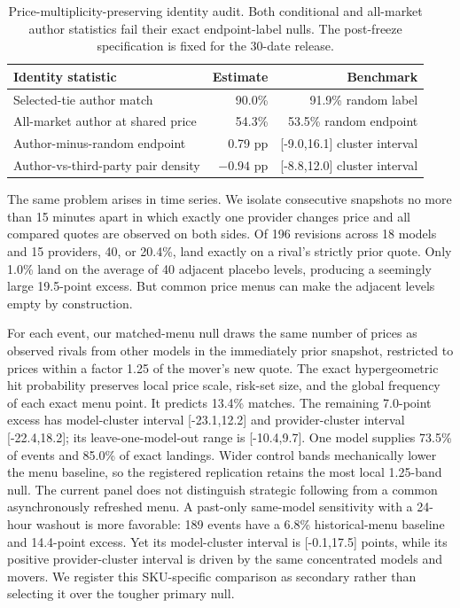 \documentclass[11pt]{article}
\newcommand{\1}{\mathbf{1}}
\begin{document}
{\begin{table}[H]
\centering
\small
\begin{tabular}{lrr}
\toprule
Identity statistic & Estimate & Benchmark \\
\midrule
Selected-tie author match & 90.0\% & 91.9\% random label \\
All-market author at shared price & 54.3\% & 53.5\% random endpoint \\
Author-minus-random endpoint & 0.79 pp & [-9.0,16.1] cluster interval \\
Author-vs-third-party pair density & $-0.94$ pp & [-8.8,12.0] cluster interval \\
\bottomrule
\end{tabular}
\caption{Price-multiplicity-preserving identity audit.  Both conditional and
all-market author statistics fail their exact endpoint-label nulls.  The
post-freeze specification is fixed for the 30-date release.}
\label{tab:authoratom}
\end{table}

The same problem arises in time series.  We isolate consecutive snapshots no more
than 15 minutes apart in which exactly one provider changes price and all compared
quotes are observed on both sides.  Of 196 revisions across 18 models and 15
providers, 40, or 20.4\%, land exactly on a rival's strictly prior quote.  Only
1.0\% land on the average of 40 adjacent placebo levels, producing a seemingly
large 19.5-point excess.  But common price menus can make the adjacent levels
empty by construction.

For each event, our matched-menu null draws the same number of prices as observed
rivals from other models in the immediately prior snapshot, restricted to prices
within a factor 1.25 of the mover's new quote.  The exact hypergeometric hit
probability preserves local price scale, risk-set size, and the global frequency
of each exact menu point.  It predicts 13.4\% matches.  The remaining 7.0-point
excess has model-cluster interval [-23.1,12.2] and provider-cluster interval
[-22.4,18.2]; its leave-one-model-out range is [-10.4,9.7].  One model supplies
73.5\% of events and 85.0\% of exact landings.  Wider control bands mechanically
lower the menu baseline, so the registered replication retains the most local
1.25-band null.  The current panel does not distinguish strategic following from
a common asynchronously refreshed menu.  A past-only same-model sensitivity with
a 24-hour washout is more favorable: 189 events have a 6.8\% historical-menu
baseline and 14.4-point excess.  Yet its model-cluster interval is
[-0.1,17.5] points, while its positive provider-cluster interval is driven by the
same concentrated models and movers.  We register this SKU-specific comparison as
secondary rather than selecting it over the tougher primary null.

}
\end{document}
